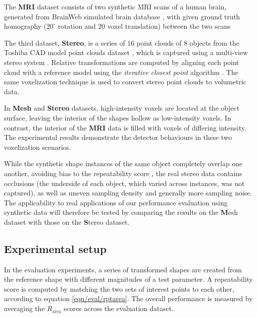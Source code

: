 The \textbf{MRI} dataset consists of two synthetic MRI scans of a human brain, generated from BrainWeb simulated brain database \cite{Cocosco1997}, with given ground truth homography ($20^{\circ}$ rotation and $20$ voxel translation) between the two scans

The third dataset, \textbf{Stereo}, is a series of $16$ point clouds of $8$ objects from the Toshiba CAD model point clouds dataset \cite{Pham2011}, which is captured using a multi-view stereo system \cite{Vogiatzis2011}.  Relative transformations are computed by aligning each point cloud with a reference model using the \emph{iterative closest point} algorithm \cite{Besl1992}. The same voxelization technique is used to convert stereo point clouds to volumetric data.

In \textbf{Mesh} and \textbf{Stereo} datasets, high-intensity voxels are located at the object surface, leaving the interior of the shapes hollow as low-intensity voxels. In contrast, the interior of the \textbf{MRI} data is filled with voxels of differing intensity. The experimental results demonstrate the detector behaviours in these two voxelization scenarios.

While the synthetic shape instances of the same object completely overlap one another, avoiding bias to the repeatability score \cite{Willis2009}, the real stereo data contains occlusions (the underside of each object, which varied across instances, was not captured), as well as uneven sampling density and generally more sampling noise. The applicability to real applications of our performance evaluation using synthetic data will therefore be tested by comparing the results on the {\textbf Mesh} dataset with those on the {\textbf Stereo} dataset. 




\subsection{Experimental setup}
\label{sec/eval/variation}
In the evaluation experiments, a series of transformed shapes are created from the reference shape with different magnitudes of a test parameter. A repeatability score is computed by matching the two sets of interest points to each other, according to equation \ref{eqn/eval/rptarea}. 
The overall performance is measured by averaging the $R_{\textrm{area}}$ scores across the evaluation dataset. 

